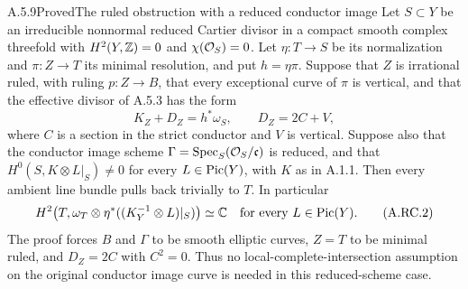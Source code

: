 
\begin{statement}{A.5.9}{Proved}{The ruled obstruction with a reduced conductor image}
Let $S\subset Y$ be an irreducible nonnormal reduced Cartier
divisor in a compact smooth complex threefold with
$H^2(Y,\mathbb Z)=0$ and $\chi(\mathcal O_S)=0$.
Let $\eta:T\to S$ be its normalization and
$\pi:Z\to T$ its minimal resolution, and put $h=\eta\pi$.
Suppose that $Z$ is irrational ruled, with ruling $p:Z\to B$,
that every exceptional curve of $\pi$ is vertical, and that
the effective divisor of A.5.3 has the form
\[
 K_Z+D_Z=h^*\omega_S,\qquad D_Z=2C+V,                 \tag{A.RC.1}
\]
where $C$ is a section in the strict conductor and $V$ is
vertical. Suppose also that the conductor image scheme
$\Gamma=\operatorname{Spec}_S(\mathcal O_S/\mathfrak c)$ is reduced,
and that $H^0(S,K\otimes L|_S)\ne0$ for every $L\in\operatorname{Pic}(Y)$,
with $K$ as in A.1.1.
Then every ambient line bundle pulls back trivially to $T$.
In particular
\[
 H^2\bigl(T,\omega_T\otimes
       \eta^*((K_Y^{-1}\otimes L)|_S)\bigr)\simeq\mathbb C
       \quad\hbox{for every }L\in\operatorname{Pic}(Y).            \tag{A.RC.2}
\]
The proof forces $B$ and $\Gamma$ to be smooth elliptic curves,
$Z=T$ to be minimal ruled, and $D_Z=2C$ with $C^2=0$.
Thus no local-complete-intersection assumption on the original
conductor image curve is needed in this reduced-scheme case.
\end{statement}
